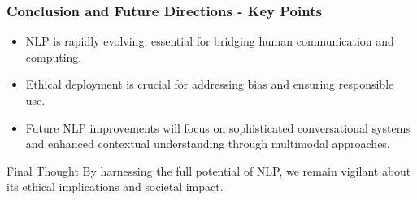 \documentclass{beamer}
\begin{document}
\begin{frame}[fragile]
    \frametitle{Conclusion and Future Directions - Key Points}
    \begin{itemize}
        \item NLP is rapidly evolving, essential for bridging human communication and computing.
        \item Ethical deployment is crucial for addressing bias and ensuring responsible use.
        \item Future NLP improvements will focus on sophisticated conversational systems and enhanced contextual understanding through multimodal approaches.
    \end{itemize}
    
    \begin{block}{Final Thought}
        By harnessing the full potential of NLP, we remain vigilant about its ethical implications and societal impact.
    \end{block}
\end{frame}
\end{document}
